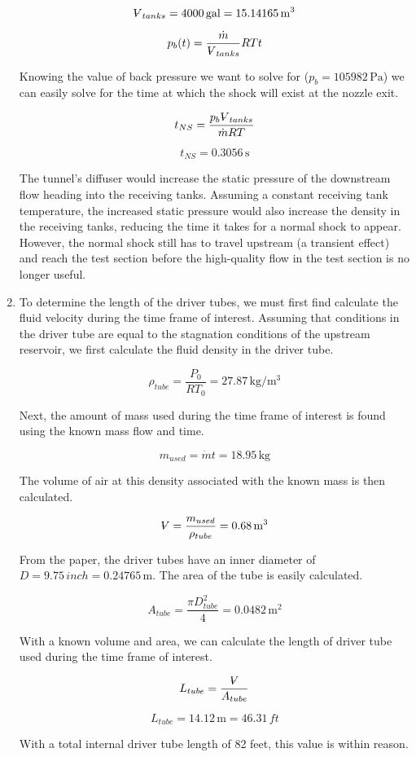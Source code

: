 \documentclass[../main.tex]{subfiles}
\begin{document}
\begin{enumerate}[label=(\alph*)]
    \[
        \volume_{tanks} = 4000 \, \unit{gal} = 15.14165\,\unit{\meter\cubed}
    \]

    \[
        p_b(t) = \frac{\dot{m}}{\volume_{tanks}}R T t
    \]

    Knowing the value of back pressure we want to solve for (\(p_b = 105982 \, \unit{\pascal}\)) we can easily solve for the time at which the shock will exist at the nozzle exit.

    \[
        t_{NS} = \frac{p_b \volume_{tanks}}{\dot{m} R T}  
    \]

    \[
        \boxed{t_{NS} = 0.3056\,\unit{\second}}
    \]

    The tunnel's diffuser would increase the static pressure of the downstream flow heading into the receiving tanks.
    Assuming a constant receiving tank temperature, the increased static pressure would also increase the density in the receiving tanks, reducing the time it takes for a normal shock to appear.
    However, the normal shock still has to travel upstream (a transient effect) and reach the test section before the high-quality flow in the test section is no longer useful.

    \item To determine the length of the driver tubes, we must first find calculate the fluid velocity during the time frame of interest.
    Assuming that conditions in the driver tube are equal to the stagnation conditions of the upstream reservoir, we first calculate the fluid density in the driver tube.

    \[
        \rho_{tube} = \frac{P_0}{RT_0} = 27.87 \, \unit{\kilogram/\meter\cubed}
    \]

    Next, the amount of mass used during the time frame of interest is found using the known mass flow and time.

    \[
        m_{used} = \dot{m} t = 18.95 \, \unit{\kilogram}  
    \]

    The volume of air at this density associated with the known mass is then calculated.

    \[
        \volume = \frac{m_{used}}{\rho_{tube}} = 0.68 \, \unit{\meter\cubed}
    \]

    From the paper, the driver tubes have an inner diameter of \(D=9.75\,\unit{inch}=0.24765\,\unit{\meter}\).
    The area of the tube is easily calculated.

    \[
        A_{tube} = \frac{\pi D_{tube}^2}{4} = 0.0482 \, \unit{\meter\squared}  
    \]

    With a known volume and area, we can calculate the length of driver tube used during the time frame of interest.

    \[
        L_{tube} = \frac{\volume}{A_{tube}}  
    \]

    \[
        \boxed{L_{tube} = 14.12 \, \unit{\meter} = 46.31 \, \unit{ft}}
    \]

    With a total internal driver tube length of 82 feet, this value is within reason.

\end{enumerate}
\end{document}

